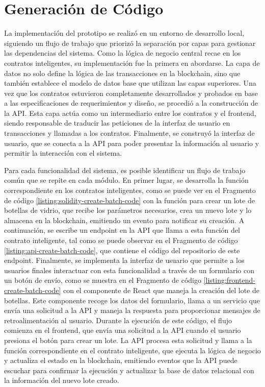 \section{Generación de Código}
\label{sec:code-generation}

La implementación del prototipo se realizó en un entorno de desarrollo local, siguiendo un flujo de trabajo que priorizó la separación por capas para gestionar las dependencias del sistema. Como la lógica de negocio central recae en los contratos inteligentes, su implementación fue la primera en abordarse. La capa de datos no solo define la lógica de las transacciones en la blockchain, sino que también establece el modelo de datos base que utilizan las capas superiores. Una vez que los contratos estuvieron completamente desarrollados y probados en base a las especificaciones de requerimientos y diseño, se procedió a la construcción de la API. Esta capa actúa como un intermediario entre los contratos y el frontend, siendo responsable de traducir las peticiones de la interfaz de usuario en transacciones y llamadas a los contratos. Finalmente, se construyó la interfaz de usuario, que se conecta a la API para poder presentar la información al usuario y permitir la interacción con el sistema.

Para cada funcionalidad del sistema, es posible identificar un flujo de trabajo común que se repite en cada módulo. En primer lugar, se desarrolla la función correspondiente en los contratos inteligentes, como se puede ver en el Fragmento de código \ref{listing:solidity-create-batch-code} con la función para crear un lote de botellas de vidrio, que recibe los parámetros necesarios, crea un nuevo lote y lo almacena en la blockchain, emitiendo un evento para notificar su creación. A continuación, se escribe un endpoint en la API que llama a esta función del contrato inteligente, tal como se puede observar en el Fragmento de código \ref{listing:api-create-batch-code}, que contiene el código del repositorio de este endpoint. Finalmente, se implementa la interfaz de usuario que permite a los usuarios finales interactuar con esta funcionalidad a través de un formulario con un botón de envío, como se muestra en el Fragmento de código \ref{listing:frontend-create-batch-code} con el componente de React que maneja la creación del lote de botellas. Este componente recoge los datos del formulario, llama a un servicio que envía una solicitud a la API y maneja la respuesta para proporcionar mensajes de retroalimentación al usuario. Durante la ejecución de este código, el flujo comienza en el frontend, que envía una solicitud a la API cuando el usuario presiona el botón para crear un lote. La API procesa esta solicitud y llama a la función correspondiente en el contrato inteligente, que ejecuta la lógica de negocio y actualiza el estado en la blockchain, emitiendo eventos que la API puede escuchar para confirmar la ejecución y actualizar la base de datos relacional con la información del nuevo lote creado. 

